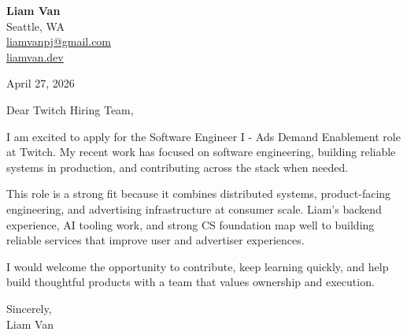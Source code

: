 \documentclass[letterpaper,11pt]{article}
\begin{document}
\begin{flushleft}
\textbf{\Large Liam Van} \\
Seattle, WA \\
\href{mailto:liamvanpj@gmail.com}{liamvanpj@gmail.com} \\
\href{https://liamvan.dev}{liamvan.dev}
\end{flushleft}

April 27, 2026

\noindent Dear Twitch Hiring Team,

\noindent I am excited to apply for the Software Engineer I - Ads Demand Enablement role at Twitch. My recent work has focused on software engineering, building reliable systems in production, and contributing across the stack when needed.

\noindent This role is a strong fit because it combines distributed systems, product-facing engineering, and advertising infrastructure at consumer scale. Liam's backend experience, AI tooling work, and strong CS foundation map well to building reliable services that improve user and advertiser experiences.

\noindent I would welcome the opportunity to contribute, keep learning quickly, and help build thoughtful products with a team that values ownership and execution.

\noindent Sincerely, \\
Liam Van
\end{document}
